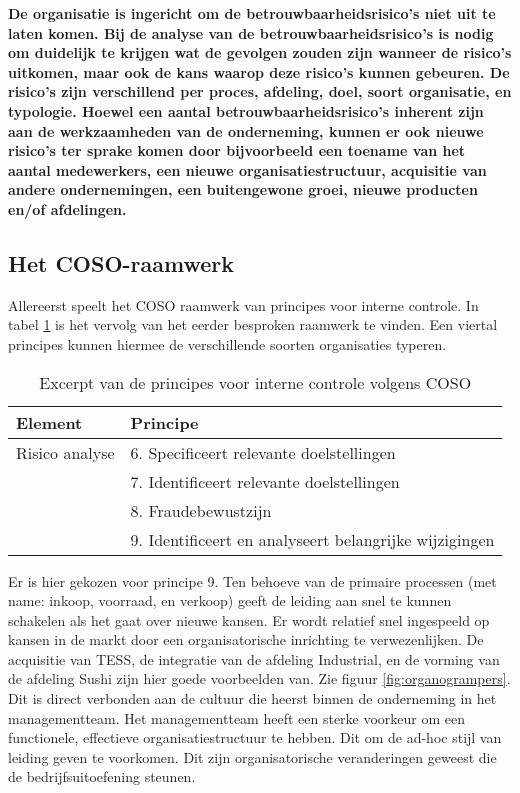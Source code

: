 \textbf{De organisatie is ingericht om de betrouwbaarheidsrisico's niet uit te laten komen. Bij de analyse van de betrouwbaarheidsrisico's is nodig om duidelijk te krijgen wat de gevolgen zouden zijn wanneer de risico's uitkomen, maar ook de kans waarop deze risico's kunnen gebeuren. De risico's zijn verschillend per proces, afdeling, doel, soort organisatie, en typologie. Hoewel een aantal betrouwbaarheidsrisico's inherent zijn aan de werkzaamheden van de onderneming, kunnen er ook nieuwe risico's ter sprake komen door bijvoorbeeld een toename van het aantal medewerkers, een nieuwe organisatiestructuur, acquisitie van andere ondernemingen, een buitengewone groei, nieuwe producten en/of afdelingen.}

\subsection{Het COSO-raamwerk}
Allereerst speelt het COSO raamwerk van principes voor interne controle. In tabel \ref{tab:risicoprincipes} is het vervolg van het eerder besproken raamwerk te vinden. Een viertal principes kunnen hiermee de verschillende soorten organisaties typeren. 

\begin{table}[h]
    \centering
    \caption{Excerpt van de principes voor interne controle volgens COSO}
    \begin{tabular}{l l}
        \toprule
        \textbf{Element} & \textbf{Principe} \\
        \midrule
        Risico analyse & 6. Specificeert relevante doelstellingen \\
         & 7. Identificeert relevante doelstellingen \\
         & 8. Fraudebewustzijn \\
         & 9. Identificeert en analyseert belangrijke wijzigingen \\
        \bottomrule
    \end{tabular}
    \label{tab:risicoprincipes}
\end{table}

Er is hier gekozen voor principe 9. Ten behoeve van de primaire processen (met name: inkoop, voorraad, en verkoop) geeft de leiding aan snel te kunnen schakelen als het gaat over nieuwe kansen. Er wordt relatief snel ingespeeld op kansen in de markt door een organisatorische inrichting te verwezenlijken. De acquisitie van TESS, de integratie van de afdeling Industrial, en de vorming van de afdeling Sushi zijn hier goede voorbeelden van. Zie figuur \ref{fig:organogrampers}. Dit is direct verbonden aan de cultuur die heerst binnen de onderneming in het managementteam. Het managementteam heeft een sterke voorkeur om een functionele, effectieve organisatiestructuur te hebben. Dit om de ad-hoc stijl van leiding geven te voorkomen. Dit zijn organisatorische veranderingen geweest die de bedrijfsuitoefening steunen. 

